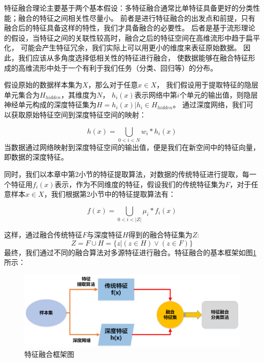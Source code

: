 特征融合理论主要基于两个基本假设：多特征融合通常比单特征具备更好的分类性能；融合的特征之间相关性尽量小。
前者是进行特征融合的出发点和前提，只有融合后的特征具备这样的特性，我们才具备融合的必要性。
后者是基于流形理论的假设，当特征之间的关联性较高时，融合之后的特征空间在高维流形中趋于扁平化，
可能会产生特征冗余，我们实际上可以用更小的维度来表征原始数据。
因此，我们应该从多角度选择低相关性的特征进行融合，
使数据能够在融合特征形成的高维流形中处于一个有利于我们任务（分类、回归等）的分布。\par

假设原始的数据样本集为$X$，那么对于任意${x \in X}$，
我们假设用于提取特征的隐层单元集合为$H_{hidden}$，其维度为$N$，
$h_i(x)$表示网络中第$i$个单元的输出值，则隐层神经单元构成的深度特征集为$H={h_i(x)|h_i \in H_{hidden}}$。
通过深度网络，我们可以获取原始特征空间到深度特征空间的映射：\par
\begin{equation}
	\label{eqt_4_15}
	h(x) = \bigcup_{0<i<N} w_i * h_{i}(x)
\end{equation}
当数据通过网络映射到深度特征空间的输出值，便是我们在新空间中的特征向量，即数据的深度特征。\par

同时，我们以本章中第2小节的特征提取算法，对数据的传统特征进行提取，每一个特征用$f_{i}(x)$表示，作为不同维度的特征，假设我们的传统特征集为$F$，对于任意样本$x \in X$，我们根据第2小节中的特征提取算法有：\par
\begin{equation}
	\label{eqt_4_16}
	f(x) = \bigcup_{0<i<|Z|}\mu_{i} * f_{i}(x)
\end{equation}

这样，通过融合传统特征$F$与深度特征$H$得到的融合特征集为$Z$:
\begin{equation}
\label{eqt_4_17}
	Z =F \cup H = \{ z | (z \in H) \vee (z \in F) \}
\end{equation}
最终，我们通过不同的融合算法对多源特征进行融合。特征融合的基本框架如图\ref{sec:fig_4_1}所示：

\begin{figure}[!h]
	\centering
	\includegraphics[scale=0.5]{figures/chapter_4/fig_4_1.png}
	\caption{特征融合框架图}\label{sec:fig_4_1}
\end{figure}

